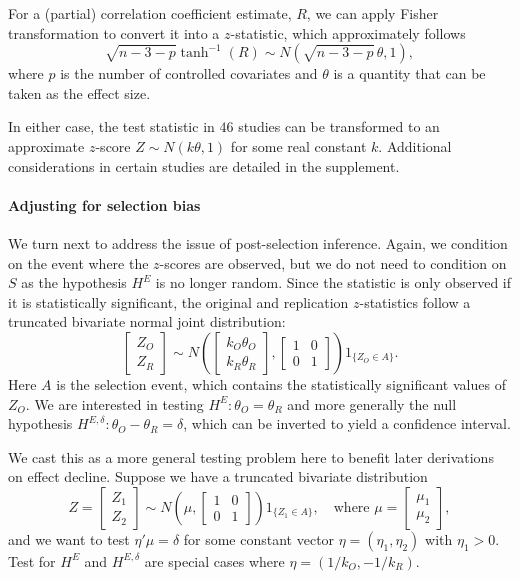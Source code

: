 \documentclass[11pt]{article}
\theoremstyle{definition}
\theoremstyle{custom}
\begin{document}
  For a (partial) correlation coefficient estimate, $R$, we can apply Fisher transformation \citeyearpar{Fisher:1921vq,Fisher:1924ve} to convert it into a $z$-statistic, which approximately follows
  \[
    \sqrt{n-3-p} \tanh^{-1}(R) \sim N(\sqrt{n-3-p}\,\theta, 1),
  \]
  where $p$ is the number of controlled covariates and $\theta$ is a quantity that can be taken as the effect size.

  In either case, the test statistic in $46$ studies can be transformed to an approximate $z$-score $Z \sim N(k \theta, 1)$ for some real constant $k$. Additional considerations in certain studies are detailed in the supplement.

  \paragraph{Adjusting for selection bias} We turn next to address the issue of post-selection inference. Again, we condition on the event where the $z$-scores are observed, but we do not need to condition on $S$ as the hypothesis $H^E$ is no longer random. Since the statistic is only observed if it is statistically significant, the original and replication $z$-statistics follow a truncated bivariate normal joint distribution:
  \[
    \begin{bmatrix}
      Z_O \\ Z_R
    \end{bmatrix} \sim N\left(\begin{bmatrix}
      k_O \theta_O \\ k_R \theta_R
    \end{bmatrix}, \begin{bmatrix}
      1 & 0 \\ 0 & 1
    \end{bmatrix}\right) 1_{\{Z_O \in A\}}.
  \]
  Here $A$ is the selection event, which contains the statistically significant values of $Z_O$. We are interested in testing $H^E: \theta_O = \theta_R$ and more generally the null hypothesis $H^{E,\delta}: \theta_O - \theta_R = \delta$, which can be inverted to yield a confidence interval.

  We cast this as a more general testing problem here to benefit later derivations on effect decline. Suppose we have a truncated bivariate distribution
  \[
    Z = \begin{bmatrix}
      Z_1 \\ Z_2
    \end{bmatrix} \sim N\left(\mu, \begin{bmatrix}
      1 & 0 \\ 0 & 1
    \end{bmatrix}\right) 1_{\{Z_1 \in A\}}, \quad \text{where } \mu = \begin{bmatrix}
      \mu_1 \\ \mu_2
    \end{bmatrix},
  \]
  and we want to test $\eta' \mu = \delta$ for some constant vector $\eta = (\eta_1, \eta_2)$ with $\eta_1 > 0$. Test for $H^E$ and $H^{E,\delta}$ are special cases where $\eta = (1/k_O, -1/k_R)$.
\end{document}
